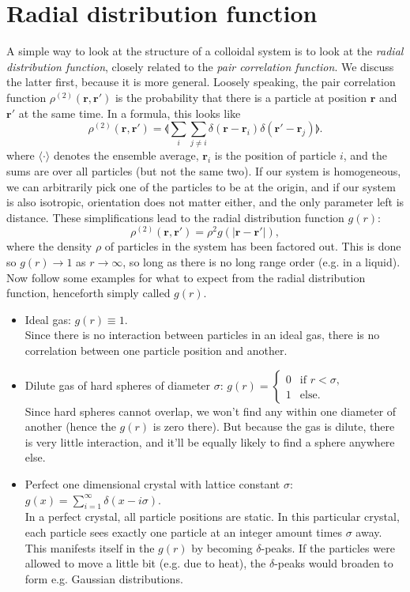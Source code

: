 \documentclass[thesis]{subfiles}
\begin{document}
\section{Radial distribution function}

A simple way to look at the structure of a colloidal system is to look at the \emph{radial distribution function}, closely related to the \emph{pair correlation function}. We discuss the latter first, because it is more general. Loosely speaking, the pair correlation function $\rho^{(2)}(\bm r, \bm r')$ is the probability that there is a particle at position $\bm r$ and $\bm r'$ at the same time. In a formula, this looks like 
\begin{equation}
	\rho^{(2)}(\bm r, \bm r') = \llangle \sum_i \sum_{j \neq i} \delta(\bm r - \bm r_i) \delta(\bm r' - \bm r_j) \rrangle.
\end{equation}
where $\langle \cdot \rangle$ denotes the ensemble average, $\bm r_i$ is the position of particle $i$, and the sums are over all particles (but not the same two).
If our system is homogeneous, we can arbitrarily pick one of the particles to be at the origin, and if our system is also isotropic, orientation does not matter either, and the only parameter left is distance. These simplifications lead to the radial distribution function $g(r):$
\begin{equation}
	\rho^{(2)}(\bm r, \bm r') = \rho^2 g(|\bm r - \bm r'|),
\end{equation}
where the density $\rho$ of particles in the system has been factored out. This is done so $g(r) \rightarrow 1$ as $r \rightarrow \infty$, so long as there is no long range order (e.g. in a liquid). Now follow some examples for what to expect from the radial distribution function, henceforth simply called $g(r)$.
\begin{itemize}
	\item Ideal gas: $g(r) \equiv 1$.\\
	Since there is no interaction between particles in an ideal gas, there is no correlation between one particle position and another.
	\item Dilute gas of hard spheres of diameter $\sigma$: $g(r) = \begin{cases} 0 & \textrm{if } r < \sigma, \\ 1 & \textrm{else.} \end{cases}$\\
	Since hard spheres cannot overlap, we won't find any within one diameter of another (hence the $g(r)$ is zero there). But because the gas is dilute, there is very little interaction, and it'll be equally likely to find a sphere anywhere else.
	\item Perfect one dimensional crystal with lattice constant $\sigma$: $g(x) = \sum_{i = 1}^\infty \delta(x - i\sigma)$.\\
	In a perfect crystal, all particle positions are static. In this particular crystal, each particle sees exactly one particle at an integer amount times $\sigma$ away. This manifests itself in the $g(r)$ by becoming $\delta$-peaks. If the particles were allowed to move a little bit (e.g. due to heat), the $\delta$-peaks would broaden to form e.g. Gaussian distributions.
\end{itemize}
\end{document}
